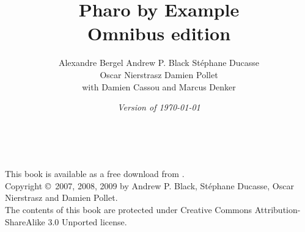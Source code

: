 \documentclass[a4paper,10pt,twoside]{book}
\begin{document}
\frontmatter
\setcounter{page}{1}
\pagestyle{headings}
\author{
	 Alexandre Bergel\quad
	Andrew P. Black\quad
	St\'ephane Ducasse\\[1ex]
	Oscar Nierstrasz\quad
	Damien Pollet
	\\[4ex]
	with Damien Cassou and Marcus Denker}
\title{\Huge\bf Pharo by Example\\ Omnibus edition}
\isodate
\date{\emph{Version of \today}}
\maketitle
~ %
\vfill
\begin{footnotesize}
\setlength{\parindent}{0pt}
This book is available as a free download from \pbe.\\[1cm]

Copyright \copyright~2007, 2008, 2009 by Andrew P. Black, St\'ephane Ducasse, Oscar Nierstrasz and Damien Pollet.\\[1cm]

The contents of this book are protected under Creative Commons Attribution-ShareAlike 3.0 Unported license.


\end{footnotesize}
\end{document}
